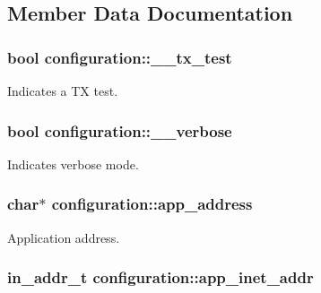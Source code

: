 \subsection{\-Member \-Data \-Documentation}
\hypertarget{structconfiguration_ab091029031b2162a70659a7508c5e969}{
\subsubsection[{\-\_\-\-\_\-tx\-\_\-test}]{\setlength{\rightskip}{0pt plus 5cm}bool {\bf configuration\-::\-\_\-\-\_\-tx\-\_\-test}}}\label{structconfiguration_ab091029031b2162a70659a7508c5e969}
\-Indicates a \-T\-X test. \hypertarget{structconfiguration_a41c9072ed719e9b35f559682b7a79949}{
\subsubsection[{\-\_\-\-\_\-verbose}]{\setlength{\rightskip}{0pt plus 5cm}bool {\bf configuration\-::\-\_\-\-\_\-verbose}}}\label{structconfiguration_a41c9072ed719e9b35f559682b7a79949}
\-Indicates verbose mode. \hypertarget{structconfiguration_a50ce734299291eb2bbad55de949fa29f}{
\subsubsection[{app\-\_\-address}]{\setlength{\rightskip}{0pt plus 5cm}char$\ast$ {\bf configuration\-::app\-\_\-address}}}\label{structconfiguration_a50ce734299291eb2bbad55de949fa29f}
\-Application address. \hypertarget{structconfiguration_a07b4124a5e4551d7c369bec893b93a17}{
\subsubsection[{app\-\_\-inet\-\_\-addr}]{\setlength{\rightskip}{0pt plus 5cm}in\-\_\-addr\-\_\-t {\bf configuration\-::app\-\_\-inet\-\_\-addr}}}\label{structconfiguration_a07b4124a5e4551d7c369bec893b93a17}
